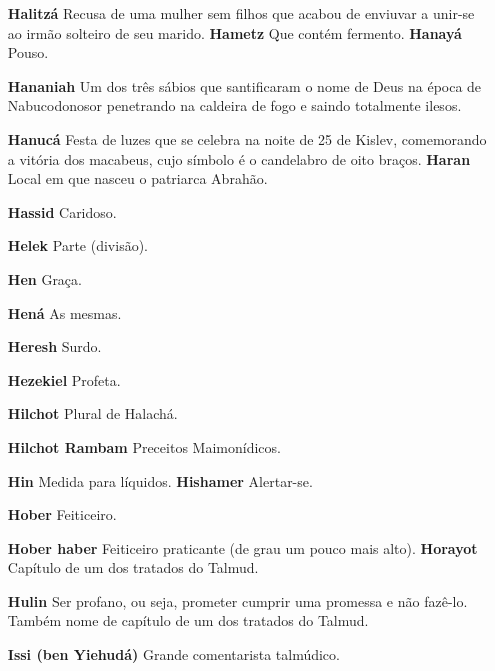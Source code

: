 \begin{itemize}
\item[\textbf{Halitzá}] Recusa de uma mulher sem filhos que acabou de
enviuvar a unir-se ao irmão solteiro de seu marido. \textbf{Hametz}
Que contém fermento. \textbf{Hanayá} Pouso.

\item[\textbf{Hananiah}] Um dos três sábios que santificaram o nome de Deus
na épo­ca de Nabucodonosor penetrando na caldeira de fogo e saindo
totalmente ilesos.

\item[\textbf{Hanucá}] Festa de luzes que se cele­bra na noite de 25 de
Kislev, comemo­rando a vitória dos macabeus, cujo símbolo é o candelabro
de oito braços. \textbf{Haran} Local em que nasceu o patriar­ca
Abrahão.

\item[\textbf{Hassid}] Caridoso.

\item[\textbf{Helek}] Parte (divisão).

\item[\textbf{Hen}] Graça.

\item[\textbf{Hená}] As mesmas.

\item[\textbf{Heresh}] Surdo.

\item[\textbf{Hezekiel}] Profeta.

\item[\textbf{Hilchot}] Plural de Halachá.

\item[\textbf{Hilchot Rambam}] Preceitos Maimo­nídicos.

\item[\textbf{Hin} Medida para líquidos. \textbf{Hishamer}] Alertar-se.

\item[\textbf{Hober}] Feiticeiro.

\item[\textbf{Hober haber}] Feiticeiro praticante (de grau um pouco mais
alto). \textbf{Horayot} Capítulo de um dos trata­dos do Talmud.

\item[\textbf{Hulin}] Ser profano, ou seja, prome­ter cumprir uma promessa e
não fazê-lo. Também nome de capítulo de um dos tratados do Talmud.

\item[\textbf{Issi (ben Yiehudá)}] Grande comen­tarista talmúdico.


\end{itemize}
